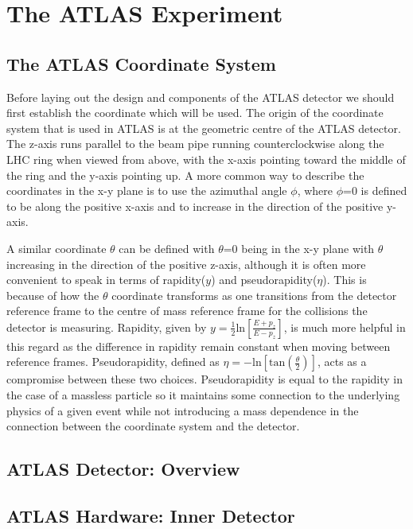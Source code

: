 \section{The ATLAS Experiment}
\label{Sec:ATLAS}

\subsection{The ATLAS Coordinate System}

Before laying out the design and components of the ATLAS detector we should first establish the coordinate which will be used.  
The origin of the coordinate system that is used in ATLAS is at the geometric centre of the ATLAS detector.  
The z-axis runs parallel to the beam pipe running counterclockwise along the LHC ring when viewed from above, with the x-axis pointing toward the middle of the ring and the y-axis pointing up.  
A more common way to describe the coordinates in the x-y plane is to use the azimuthal angle $\phi$, where $\phi$=0 is defined to be along the positive x-axis and to increase in the direction of the positive y-axis.

A similar coordinate $\theta$ can be defined with $\theta$=0 being in the x-y plane with $\theta$ increasing in the direction of the positive z-axis, although it is often more convenient to speak in terms of rapidity($y$) and pseudorapidity($\eta$).  
This is because of how the $\theta$ coordinate transforms as one transitions from the detector reference frame to the centre of mass reference frame for the collisions the detector is measuring.  
Rapidity, given by $y=\frac{1}{2}\mathrm{ln}\left[\frac{E+p_{z}}{E-p_z}\right]$, is much more helpful in this regard as the difference in rapidity remain constant when moving between reference frames.  
Pseudorapidity, defined as $\eta=-\mathrm{ln}\left[\mathrm{tan}\left(\frac{\theta}{2}\right)\right]$, acts as a compromise between these two choices.  
Pseudorapidity is equal to the rapidity in the case of a massless particle so it maintains some connection to the underlying physics of a given event while not introducing a mass dependence in the connection between the coordinate system and the detector.  


\subsection{ATLAS Detector: Overview}

\subsection{ATLAS Hardware: Inner Detector}

